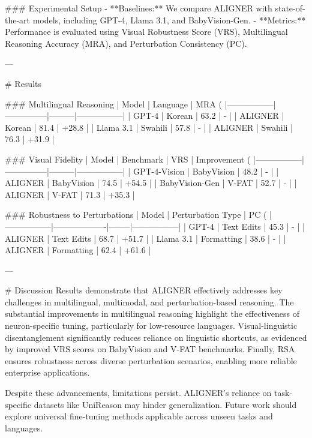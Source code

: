 ### Experimental Setup
- **Baselines:** We compare ALIGNER with state-of-the-art models, including GPT-4, Llama 3.1, and BabyVision-Gen.
- **Metrics:** Performance is evaluated using Visual Robustness Score (VRS), Multilingual Reasoning Accuracy (MRA), and Perturbation Consistency (PC).

---

# Results

### Multilingual Reasoning
| Model          | Language       | MRA (%
|-----------------|---------------|---------|-----------------|
| GPT-4          | Korean         | 63.2    | -               |
| ALIGNER        | Korean         | 81.4    | +28.8           |
| Llama 3.1      | Swahili        | 57.8    | -               |
| ALIGNER        | Swahili        | 76.3    | +31.9           |

### Visual Fidelity
| Model          | Benchmark      | VRS     | Improvement (%
|-----------------|---------------|---------|-----------------|
| GPT-4-Vision   | BabyVision     | 48.2    | -               |
| ALIGNER        | BabyVision     | 74.5    | +54.5           |
| BabyVision-Gen | V-FAT          | 52.7    | -               |
| ALIGNER        | V-FAT          | 71.3    | +35.3           |

### Robustness to Perturbations
| Model          | Perturbation Type | PC (%
|-----------------|-------------------|--------|-----------------|
| GPT-4          | Text Edits        | 45.3   | -               |
| ALIGNER        | Text Edits        | 68.7   | +51.7           |
| Llama 3.1      | Formatting        | 38.6   | -               |
| ALIGNER        | Formatting        | 62.4   | +61.6           |

---

# Discussion
Results demonstrate that ALIGNER effectively addresses key challenges in multilingual, multimodal, and perturbation-based reasoning. The substantial improvements in multilingual reasoning highlight the effectiveness of neuron-specific tuning, particularly for low-resource languages. Visual-linguistic disentanglement significantly reduces reliance on linguistic shortcuts, as evidenced by improved VRS scores on BabyVision and V-FAT benchmarks. Finally, RSA ensures robustness across diverse perturbation scenarios, enabling more reliable enterprise applications.

Despite these advancements, limitations persist. ALIGNER's reliance on task-specific datasets like UniReason may hinder generalization. Future work should explore universal fine-tuning methods applicable across unseen tasks and languages.


